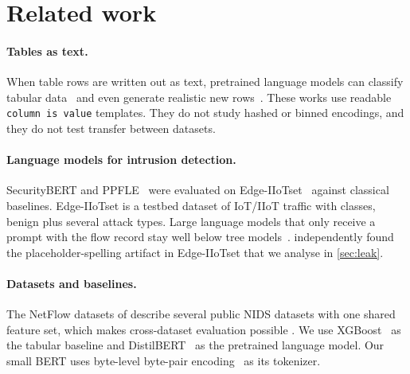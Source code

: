 \section{Related work}\label{sec:related}
\paragraph{Tables as text.} When table rows are written out as text, pretrained language models can classify tabular
data~\cite{hegselmann2022tabllm} and even generate realistic new rows~\cite{borisov2022great}. These works use
readable \texttt{column is value} templates. They do not study hashed or binned encodings, and they do not test
transfer between datasets.

\paragraph{Language models for intrusion detection.} SecurityBERT and PPFLE~\cite{ferrag2024securitybert} were
evaluated on Edge-IIoTset~\cite{ferrag2022edge} against classical baselines. Edge-IIoTset is a testbed dataset of
IoT/IIoT traffic with  classes, benign plus several attack types. Large language models
that only receive a prompt with the flow record stay well below tree models~\cite{flows2words2025}.
\citet{edgeleak2026} independently found the placeholder-spelling artifact in Edge-IIoTset that we analyse in
\cref{sec:leak}.

\paragraph{Datasets and baselines.} The NetFlow datasets of \citet{sarhan2021netflow} describe
several public NIDS datasets with one shared feature set, which makes cross-dataset evaluation possible \citep{uqnids}. We use
XGBoost~\cite{chen2016xgboost} as the tabular baseline and DistilBERT~\cite{sanh2019distilbert} as the pretrained
language model. Our small BERT uses byte-level byte-pair encoding~\cite{sennrich2016bpe} as its tokenizer.
